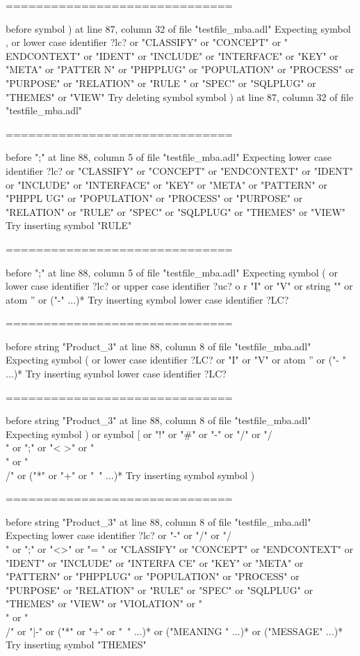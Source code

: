 \begin{description}
\begin{haskell}
==============================

before symbol ) at line 87, column 32 of file "testfile_mba.adl"
Expecting symbol , or lower case identifier ?lc? or "CLASSIFY" or "CONCEPT" or "
ENDCONTEXT" or "IDENT" or "INCLUDE" or "INTERFACE" or "KEY" or "META" or "PATTER
N" or "PHPPLUG" or "POPULATION" or "PROCESS" or "PURPOSE" or "RELATION" or "RULE
" or "SPEC" or "SQLPLUG" or "THEMES" or "VIEW"
Try deleting symbol symbol ) at line 87, column 32 of file "testfile_mba.adl"

==============================

before ";" at line 88, column 5 of file "testfile_mba.adl"
Expecting lower case identifier ?lc? or "CLASSIFY" or "CONCEPT" or "ENDCONTEXT"
or "IDENT" or "INCLUDE" or "INTERFACE" or "KEY" or "META" or "PATTERN" or "PHPPL
UG" or "POPULATION" or "PROCESS" or "PURPOSE" or "RELATION" or "RULE" or "SPEC"
or "SQLPLUG" or "THEMES" or "VIEW"
Try inserting symbol "RULE"

==============================

before ";" at line 88, column 5 of file "testfile_mba.adl"
Expecting symbol ( or lower case identifier ?lc? or upper case identifier ?uc? o
r "I" or "V" or string "" or atom '' or ("-" ...)*
Try inserting symbol lower case identifier ?LC?

==============================

before string "Product_3" at line 88, column 8 of file "testfile_mba.adl"
Expecting symbol ( or lower case identifier ?LC? or "I" or "V" or atom '' or ("-
" ...)*
Try inserting symbol lower case identifier ?LC?

==============================

before string "Product_3" at line 88, column 8 of file "testfile_mba.adl"
Expecting symbol ) or symbol [ or "!" or "#" or "-" or "/" or "/\\" or ";" or "<
>" or "\\" or "\\/" or ("*" or "+" or "~" ...)*
Try inserting symbol symbol )

==============================

before string "Product_3" at line 88, column 8 of file "testfile_mba.adl"
Expecting lower case identifier ?lc? or "-" or "/" or "/\\" or ";" or "<>" or "=
" or "CLASSIFY" or "CONCEPT" or "ENDCONTEXT" or "IDENT" or "INCLUDE" or "INTERFA
CE" or "KEY" or "META" or "PATTERN" or "PHPPLUG" or "POPULATION" or "PROCESS" or
 "PURPOSE" or "RELATION" or "RULE" or "SPEC" or "SQLPLUG" or "THEMES" or "VIEW"
or "VIOLATION" or "\\" or "\\/" or "|-" or ("*" or "+" or "~" ...)* or ("MEANING
" ...)* or ("MESSAGE" ...)*
Try inserting symbol "THEMES"


\end{haskell}
\end{description}
